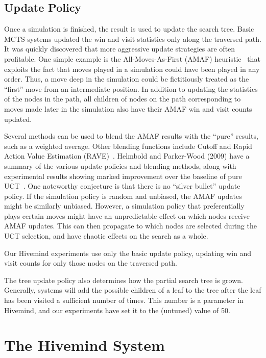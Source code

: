 \documentclass{acm_proc_article-sp}
\begin{document}
\subsection{Update Policy}
Once a simulation is finished, the result is used to update the search tree.
Basic MCTS systems updated the win and visit statistics only along the traversed path.
It was quickly discovered that more aggressive update strategies are often profitable.
One simple example is the All-Moves-As-First (AMAF) heuristic~\cite{brugmann1993monte}
that exploits the fact that moves played in a simulation could have been played in any order. 
Thus, a move deep in the simulation could be fictitiously treated as the ``first'' move from an intermediate position. 
In addition to updating the statistics of the nodes in the path, all children of nodes on the path corresponding to moves made later
in the simulation also have their AMAF win and visit counts updated. 

Several methods can be used to blend the AMAF results with the ``pure'' results, such as a weighted average.
Other blending functions include Cutoff and Rapid Action Value Estimation (RAVE)~\cite{chaslot2008progressive}. 
Helmbold and Parker-Wood (2009) have a summary of the various update policies and blending methods, along with experimental results showing marked improvement over the baseline of pure UCT~\cite{helmbold2009all}. 
One noteworthy conjecture is that there is no ``silver bullet'' update policy. If the simulation policy is random and unbiased, the AMAF updates might be similarly unbiased. However, a simulation policy that preferentially plays certain moves might have an unpredictable effect on which nodes receive AMAF updates. This can then propagate to which nodes are selected during the UCT selection, and have chaotic effects on the search as a whole. 

Our Hivemind experiments use only the basic update policy, updating win and visit counts for only those nodes on the traversed path.

The tree update policy also determines how the partial search tree is grown.
Generally, systems will add the possible children of a leaf to the tree after the leaf has been visited a sufficient number of times.
This number is a parameter in Hivemind, and our experiments have set it to the (untuned) value of 50.

\section{The Hivemind System}\label{hivemind}
\end{document}
